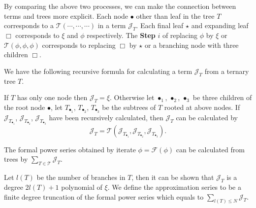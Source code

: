 \begin{itemize}
 
\end{itemize}


By comparing the above two processes, we can make the connection between terms and trees more explicit. Each node $\bullet$ other than leaf in the tree $T$ corresponds to a $\mathcal{T}(\cdots,\cdots,\cdots)$ in a term $\mathcal{J}_{T}$. Each final leaf $\star$ and expanding leaf $\Box$ corresponds to $\xi$ and $\phi$ respectively. The \textbf{Step} $i$ of replacing $\phi$ by $\xi$ or $\mathcal{T}(\phi,\phi,\phi)$ corresponds to replacing $\Box$ by $\star$ or a branching node with three children $\Box$.

We have the following recursive formula for calculating a term $\mathcal{J}_T$ from a ternary tree $T$. 

If $T$ has only one node then $\mathcal{J}_T=\xi$. Otherwise let $\bullet_1$, $\bullet_2$, $\bullet_3$ be three children of the root node $\bullet$, let $T_{\bullet_1}$, $T_{\bullet_2}$, $T_{\bullet_3}$ be the subtrees of $T$ rooted at above nodes. If $\mathcal{J}_{T_{\bullet_1}}$, $\mathcal{J}_{T_{\bullet_2}}$, $\mathcal{J}_{T_{\bullet_3}}$ have been recursively calculated, then $\mathcal{J}_T$ can be calculated by
\begin{equation}\label{eq.treeterm'}
 \mathcal{J}_T=\mathcal{T}(\mathcal{J}_{T_{\bullet_1}}, \mathcal{J}_{T_{\bullet_2}}, \mathcal{J}_{T_{\bullet_3}}).
\end{equation}

The formal power series obtained by iterate $\phi=\mathcal{F}(\phi)$ can be calculated from trees by $\sum_{T\in \mathscr{T}} \mathcal{J}_T$.

Let $l(T)$ be the number of branches in $T$, then it can be shown that $\mathcal{J}_T$ is a degree $2l(T)+1$ polynomial of $\xi$. We define the approximation series to be a finite degree truncation of the formal power series which equals to $\sum_{l(T)\le N} \mathcal{J}_T$.

